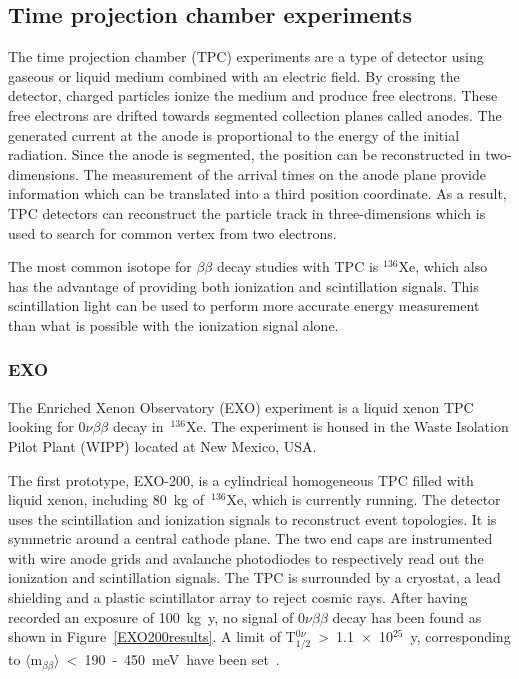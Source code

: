 \documentclass[main.tex]{subfiles}
\begin{document}
\subsection{Time projection chamber experiments}


\NI The time projection chamber (TPC) experiments are a type of detector using gaseous or liquid medium combined with an electric field. By crossing the detector, charged particles ionize the medium and produce free electrons. These free electrons are drifted towards segmented collection planes called anodes. The generated current at the anode is proportional to the energy of the initial radiation. Since the anode is segmented, the position can be reconstructed in two-dimensions. The measurement of the arrival times on the anode plane provide information which can be translated into a third position coordinate. As a result, TPC detectors can reconstruct the particle track in three-dimensions which is used to search for common vertex from two electrons.


\bigskip


\NI The most common isotope for $\beta\beta$ decay studies with TPC is $^{\text{136}}$Xe, which also has the advantage of providing both ionization and scintillation signals. This scintillation light can be used to perform more accurate energy measurement than what is possible with the ionization signal alone.    


\subsubsection{EXO}


\NI The Enriched Xenon Observatory (EXO) experiment is a liquid xenon TPC looking for 0$\nu\beta\beta$ decay in~$^{\text{136}}$Xe. The experiment is housed in the Waste Isolation Pilot Plant (WIPP) located at New Mexico, USA. 


\bigskip


\NI The first prototype, EXO-200, is a cylindrical homogeneous TPC filled with liquid xenon, including 80~kg of~$^{\text{136}}$Xe, which is currently running. The detector uses the scintillation and ionization signals to reconstruct event topologies. It is symmetric around a central cathode plane. The two end caps are instrumented with wire anode grids and avalanche photodiodes to respectively read out the ionization and scintillation signals. The TPC is surrounded by a cryostat, a lead shielding and a plastic scintillator array to reject cosmic rays. After having recorded an exposure of 100~kg~y, no signal of 0$\nu\beta\beta$ decay has been found as shown in Figure~\ref{EXO200results}. A limit of T$_{\text{1/2}}^{0\nu}$~>~1.1~$\times$~10$^{\text{25}}$~y, corresponding to $\langle \text{m}_{\beta\beta} \rangle$~<~190~-~450~meV~have been set~\cite{EXO-200}. 
\end{document}
